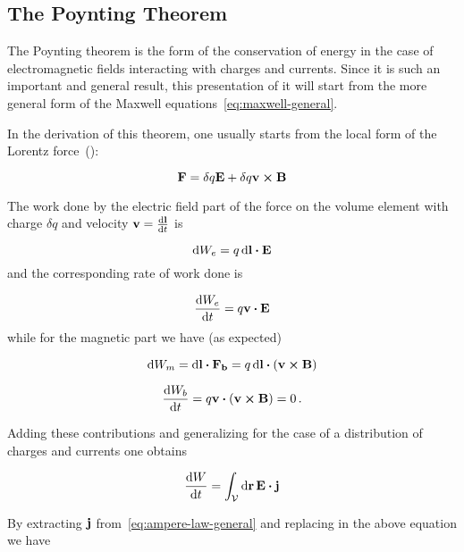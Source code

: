 \documentclass[12pt, class=report, crop=false]{standalone}
\begin{document}
\subsection{The Poynting Theorem}
\label{section:poynting}
The Poynting theorem is the form of the conservation of energy in the case of electromagnetic fields interacting with charges and currents. Since it is such an important and general result, this presentation of it will start from the more general form of the Maxwell equations~\cref{eq:maxwell-general}.
\par
In the derivation of this theorem, one usually starts from the local form of the Lorentz force~(\cite{griffithsIntroductionElectrodynamics1999}):

\begin{equation*}
  \vb{F} = \delta q \vb{E} + \delta q \vb{v} \cp \vb{B}
\end{equation*}

\par

The work done by the electric field part of the force on the volume element with charge \( \delta q \) and velocity \( \vb{v} = \dv{\vb{l}}{t} \) is

\begin{equation*}
  \dd{W_{e}} = q \dd{\vb{l}} \vdot \vb{E}
\end{equation*}
and the corresponding rate of work done is

\begin{equation*}
  \dv{W_{e}}{t} = q \vb{v} \vdot \vb{E}
\end{equation*}
while for the magnetic part we have (as expected)

\begin{equation*}
  \dd{W_{m}} = \dd{\vb{l}} \vdot \vb{F_{b}} = q \dd{\vb{l}} \vdot ( \vb{v} \cp \vb{B})
\end{equation*}

\begin{equation*}
  \dv{W_{b}}{t} = q \vb{v} \vdot ( \vb{v} \cp \vb{B}) = 0 \,.
\end{equation*}

\par
Adding these contributions and generalizing for the case of a distribution of charges and currents one obtains

\begin{equation}
  \dv{W}{t} = \int_\mathcal{V} \dd{\vb{r}} \vb{E}\vdot\vb{j}
\end{equation}

By extracting \(\vb{j}\) from~\cref{eq:ampere-law-general} and replacing in the above equation we have
\end{document}
